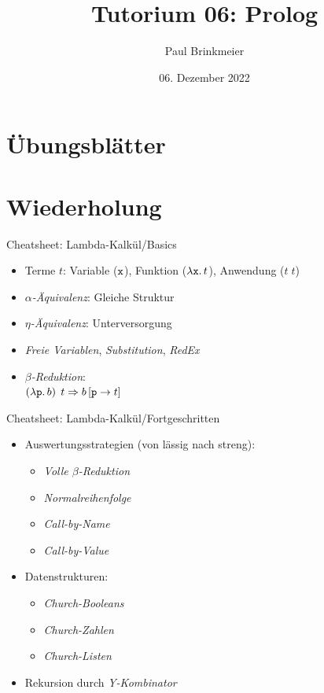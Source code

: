 \documentclass{beamer}
\title{Tutorium 06: Prolog}
\author{Paul Brinkmeier}
\institute{Tutorium Programmierparadigmen am KIT}
\date{06. Dezember 2022}
\begin{document}
\begin{frame}
	\titlepage
\end{frame}

\section{Übungsblätter}

\section{Wiederholung}

\begin{frame}{Cheatsheet: Lambda-Kalkül/Basics}
  \begin{itemize}
    \item Terme $t$: Variable ($\texttt{x}$), Funktion ($\lambda \texttt{x}.\, t$), Anwendung ($t \; t$)
    \item \emph{$\alpha$-Äquivalenz}: Gleiche Struktur
    \item \emph{$\eta$-Äquivalenz}: Unterversorgung
    \item \emph{Freie Variablen}, \emph{Substitution}, \emph{RedEx}
    \item \emph{$\beta$-Reduktion}: \\
          $(\lambda \texttt{p}.\, b)$ $t \Rightarrow b\left[\texttt{p}\rightarrow{}t\right]$
  \end{itemize}
\end{frame}


\begin{frame}{Cheatsheet: Lambda-Kalkül/Fortgeschritten}
  \begin{itemize}
    \item Auswertungsstrategien (von lässig nach streng):
    \begin{itemize}
      \item \emph{Volle $\beta$-Reduktion}
      \item \emph{Normalreihenfolge}
      \item \emph{Call-by-Name}
      \item \emph{Call-by-Value}
    \end{itemize}
    \item Datenstrukturen:
    \begin{itemize}
      \item \emph{Church-Booleans}
      \item \emph{Church-Zahlen}
      \item \emph{Church-Listen}
    \end{itemize}
    \item Rekursion durch \emph{Y-Kombinator}
  \end{itemize}
\end{frame}
\end{document}
